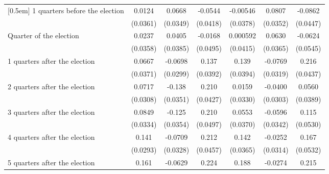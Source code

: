 \begin{table}[!ht]
\begin{tabular}{l*{6}{c}}
[0.5em]
 1 quarters before the election&      0.0124         &      0.0668         &     -0.0544         &    -0.00546         &      0.0807\sym{*}  &     -0.0862         \\
                    &    (0.0361)         &    (0.0349)         &    (0.0418)         &    (0.0378)         &    (0.0352)         &    (0.0447)         \\
[0.5em]
Quarter of the election&      0.0237         &      0.0405         &     -0.0168         &    0.000592         &      0.0630         &     -0.0624         \\
                    &    (0.0358)         &    (0.0385)         &    (0.0495)         &    (0.0415)         &    (0.0365)         &    (0.0545)         \\
[0.5em]
 1 quarters after the election&      0.0667         &     -0.0698\sym{*}  &       0.137\sym{***}&       0.139\sym{***}&     -0.0769\sym{*}  &       0.216\sym{***}\\
                    &    (0.0371)         &    (0.0299)         &    (0.0392)         &    (0.0394)         &    (0.0319)         &    (0.0437)         \\
[0.5em]
 2 quarters after the election&      0.0717\sym{*}  &      -0.138\sym{***}&       0.210\sym{***}&      0.0159         &     -0.0400         &      0.0560         \\
                    &    (0.0308)         &    (0.0351)         &    (0.0427)         &    (0.0330)         &    (0.0303)         &    (0.0389)         \\
[0.5em]
 3 quarters after the election&      0.0849\sym{*}  &      -0.125\sym{***}&       0.210\sym{***}&      0.0553         &     -0.0596         &       0.115\sym{*}  \\
                    &    (0.0334)         &    (0.0354)         &    (0.0497)         &    (0.0370)         &    (0.0342)         &    (0.0530)         \\
[0.5em]
 4 quarters after the election&       0.141\sym{***}&     -0.0709\sym{*}  &       0.212\sym{***}&       0.142\sym{***}&     -0.0252         &       0.167\sym{**} \\
                    &    (0.0293)         &    (0.0328)         &    (0.0457)         &    (0.0365)         &    (0.0314)         &    (0.0532)         \\
[0.5em]
 5 quarters after the election&       0.161\sym{***}&     -0.0629         &       0.224\sym{***}&       0.188\sym{***}&     -0.0274         &       0.215\sym{***}\\

\end{tabular}
\end{table}
